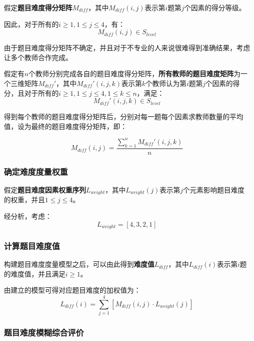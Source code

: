 假定\textbf{题目难度得分矩阵}$M_{diff}$，其中$M_{diff}(i, j)$表示第$i$题第$j$个因素的得分等级。

因此，对于所有的$i \geq 1, 1 \leq j \leq 4$，有：
$$M_{diff}(i, j)\in S_{level}$$

由于题目难度得分矩阵不确定，并且对于不专业的人来说很难得到准确结果，考虑让多个教师合作完成。

假定有$n$个教师分别完成各自的题目难度得分矩阵，\textbf{所有教师的题目难度矩阵}为一个三维矩阵$M_{diff}'$，其中$M_{diff}'(i, j, k)$表示第$k$个教师认为第$i$题第$j$个因素的得分，且对于所有的$i \geq 1, 1 \leq j \leq 4, 1 \leq k \leq n$，满足：
$$M_{diff}'(i, j, k)\in S_{level}$$

得到每个教师的题目难度得分矩阵后，分别对每一题每个因素求教师数量的平均值，设为最终的题目难度得分矩阵，即：

\begin{equation}
    M_{diff}(i, j) = 
    \frac{
        \sum_{k = 1}^{n}M_{diff}'(i, j, k)
    }{n}
\end{equation}

\subsubsection{确定难度度量权重}

假定\textbf{题目难度因素权重序列}$L_{weight}$，其中$L_{weight}(j)$表示第$j$个元素影响题目难度的权重，并且$1 \leq j \leq 4$。

经分析，考虑：
\begin{equation}
    L_{weight} = [4, 3, 2, 1]
\end{equation}

\subsubsection{计算题目难度值}

构建题目难度度量模型之后，可以由此得到\textbf{难度值}$L_{diff}$，其中$L_{diff}(i)$表示第$i$题的难度值，并且满足$i \geq 1$。

由建立的模型可得对应题目难度的加权值为：
\begin{equation}
    L_{diff}(i) = 
    \sum_{j = 1}^{4} \left [ 
        M_{diff}(i, j) \cdot L_{weight}(j)
    \right ]
\end{equation}

\subsubsection{题目难度模糊综合评价}

